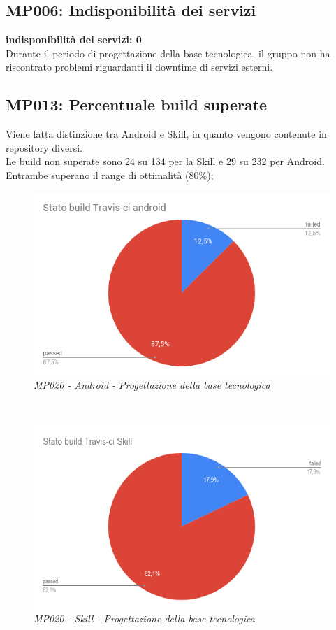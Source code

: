 \subsection{MP006: Indisponibilità dei servizi}
\textbf{indisponibilità dei servizi: 0}\\
Durante il periodo di progettazione della base tecnologica, il gruppo non ha riscontrato problemi riguardanti il downtime di servizi esterni.

\subsection{MP013: Percentuale build superate}
Viene fatta distinzione tra Android e Skill, in quanto vengono contenute in repository diversi.\\
Le build non superate sono 24 su 134 per la Skill e 29 su 232 per Android. Entrambe superano il range di ottimalità (80\%);
\begin{figure} [h]
    \centering
	\includegraphics[scale=0.5]{./images/StatobuildTravis-ciandroid.png}
    \caption{\textit{MP020 - Android - Progettazione della base tecnologica}}\label{}
\end{figure}\\
\begin{figure} [h]
    \centering
	\includegraphics[scale=0.5]{./images/StatobuildTravis-ciSkill.png}
    \caption{\textit{MP020 - Skill - Progettazione della base tecnologica}}\label{}
\end{figure}
\clearpage

